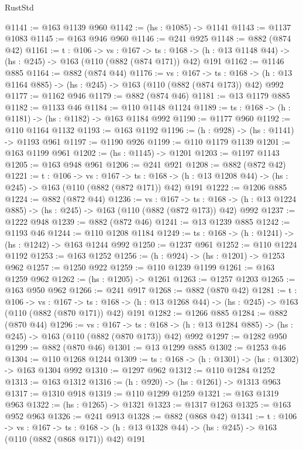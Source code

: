 \begin{lexlean}{RustStd}
\begin{coremodule}
@1141 := @163 @1139 @960
@1142 := (hs : @1085) -> @1141
@1143 := @1137 @1083
@1145 := @163 @946 @960
@1146 := @241 @925
@1148 := @882 (@874 @42)
@1161 := {t : @106} ->
  {vs : @167} ->
  {ts : @168} -> (h : @13 @1148 @44) -> (hs : @245) -> @163 (@110 (@882 (@874 @171)) @42) @191
@1162 := @1146 @885
@1164 := @882 (@874 @44)
@1176 := {vs : @167} ->
  {ts : @168} -> (h : @13 @1164 @885) -> (hs : @245) -> @163 (@110 (@882 (@874 @173)) @42) @992
@1177 := @1162 @946
@1179 := @882 (@874 @46)
@1181 := @13 @1179 @885
@1182 := @1133 @46
@1184 := @110 @1148 @1124
@1189 := {ts : @168} -> (h : @1181) -> (hs : @1182) -> @163 @1184 @992
@1190 := @1177 @960
@1192 := @110 @1164 @1132
@1193 := @163 @1192
@1196 := (h : @928) -> (hs : @1141) -> @1193 @961
@1197 := @1190 @926
@1199 := @110 @1179 @1139
@1201 := @163 @1199 @961
@1202 := (hs : @1145) -> @1201
@1203 := @1197 @1143
@1205 := @163 @948 @961
@1206 := @241 @921
@1208 := @882 (@872 @42)
@1221 := {t : @106} ->
  {vs : @167} ->
  {ts : @168} -> (h : @13 @1208 @44) -> (hs : @245) -> @163 (@110 (@882 (@872 @171)) @42) @191
@1222 := @1206 @885
@1224 := @882 (@872 @44)
@1236 := {vs : @167} ->
  {ts : @168} -> (h : @13 @1224 @885) -> (hs : @245) -> @163 (@110 (@882 (@872 @173)) @42) @992
@1237 := @1222 @948
@1239 := @882 (@872 @46)
@1241 := @13 @1239 @885
@1242 := @1193 @46
@1244 := @110 @1208 @1184
@1249 := {ts : @168} -> (h : @1241) -> (hs : @1242) -> @163 @1244 @992
@1250 := @1237 @961
@1252 := @110 @1224 @1192
@1253 := @163 @1252
@1256 := (h : @924) -> (hs : @1201) -> @1253 @962
@1257 := @1250 @922
@1259 := @110 @1239 @1199
@1261 := @163 @1259 @962
@1262 := (hs : @1205) -> @1261
@1263 := @1257 @1203
@1265 := @163 @950 @962
@1266 := @241 @917
@1268 := @882 (@870 @42)
@1281 := {t : @106} ->
  {vs : @167} ->
  {ts : @168} -> (h : @13 @1268 @44) -> (hs : @245) -> @163 (@110 (@882 (@870 @171)) @42) @191
@1282 := @1266 @885
@1284 := @882 (@870 @44)
@1296 := {vs : @167} ->
  {ts : @168} -> (h : @13 @1284 @885) -> (hs : @245) -> @163 (@110 (@882 (@870 @173)) @42) @992
@1297 := @1282 @950
@1299 := @882 (@870 @46)
@1301 := @13 @1299 @885
@1302 := @1253 @46
@1304 := @110 @1268 @1244
@1309 := {ts : @168} -> (h : @1301) -> (hs : @1302) -> @163 @1304 @992
@1310 := @1297 @962
@1312 := @110 @1284 @1252
@1313 := @163 @1312
@1316 := (h : @920) -> (hs : @1261) -> @1313 @963
@1317 := @1310 @918
@1319 := @110 @1299 @1259
@1321 := @163 @1319 @963
@1322 := (hs : @1265) -> @1321
@1323 := @1317 @1263
@1325 := @163 @952 @963
@1326 := @241 @913
@1328 := @882 (@868 @42)
@1341 := {t : @106} ->
  {vs : @167} ->
  {ts : @168} -> (h : @13 @1328 @44) -> (hs : @245) -> @163 (@110 (@882 (@868 @171)) @42) @191

\end{coremodule}
\end{lexlean}
